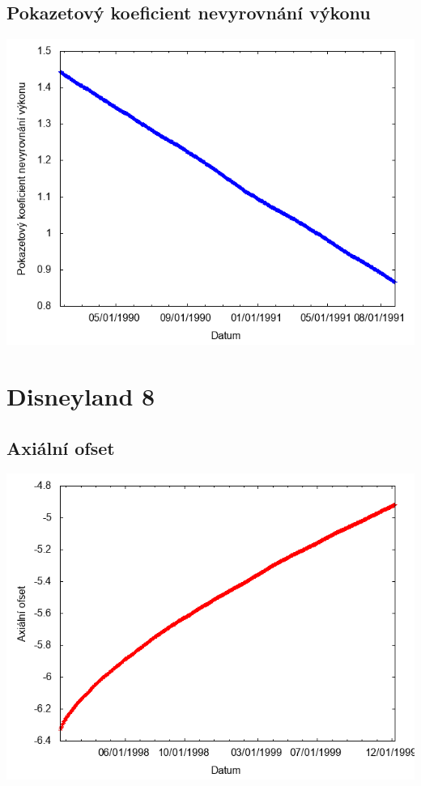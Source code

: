 \documentclass[a4paper,twoside,11pt]{article}
\begin{document}
\subsection*{Pokazetový koeficient nevyrovnání výkonu}
\begin{center}
\includegraphics[width=.8\textwidth]{graphs/Disneyland_07_fha.png}
\end{center}

\newpage
\section*{Disneyland 8}
\subsection*{Axiální ofset}
\begin{center}
\includegraphics[width=.8\textwidth]{graphs/Disneyland_08_ao.png}
\end{center}
\end{document}
